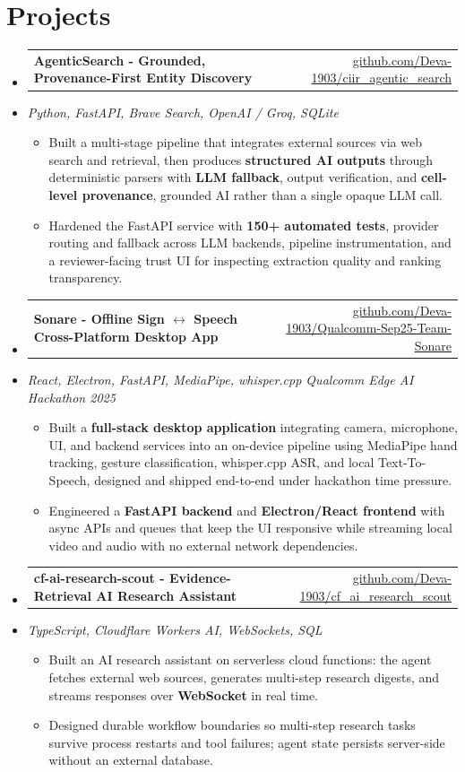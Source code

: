 \documentclass[letterpaper,10pt]{article}
\makeatletter
\newcommand{\resumeItem}[1]{
  \item\small{#1\vspace{-1pt}}
}
\newcommand{\resumeProjectHeading}[2]{
    \item
    \begin{tabular*}{0.985\textwidth}[t]{l@{\extracolsep{\fill}}r}
      \small\textbf{#1} & \small #2 \\
    \end{tabular*}\vspace{-5pt}
}
\newcommand{\resumeProjectSubheading}[1]{
  \vspace{-2pt}\item[] {\small\textcolor{ResumeSlate}{\emph{#1}}}\vspace{-3pt}
}
\newcommand{\resumeSubHeadingListStart}{\begin{itemize}[leftmargin=0.0in, label={}, itemsep=2pt, topsep=2pt]}
\newcommand{\resumeSubHeadingListEnd}{\end{itemize}}
\newcommand{\resumeItemListStart}{\begin{itemize}[leftmargin=0.18in, itemsep=2pt, topsep=1pt]}
\newcommand{\resumeItemListEnd}{\end{itemize}\vspace{-4pt}}
\makeatother
\begin{document}
\section{Projects}
\resumeSubHeadingListStart
  \resumeProjectHeading
    {AgenticSearch - Grounded, Provenance-First Entity Discovery}
    {\href{https://github.com/Deva-1903/ciir_agentic_search}{github.com/Deva-1903/ciir\_agentic\_search}}
  \resumeProjectSubheading{Python, FastAPI, Brave Search, OpenAI / Groq, SQLite}
    \resumeItemListStart
      \resumeItem{Built a multi-stage pipeline that integrates external sources via web search and retrieval, then produces \textbf{structured AI outputs} through deterministic parsers with \textbf{LLM fallback}, output verification, and \textbf{cell-level provenance}, grounded AI rather than a single opaque LLM call.}
      \resumeItem{Hardened the FastAPI service with \textbf{150+ automated tests}, provider routing and fallback across LLM backends, pipeline instrumentation, and a reviewer-facing trust UI for inspecting extraction quality and ranking transparency.}
    \resumeItemListEnd
  \resumeProjectHeading
    {Sonare - Offline Sign \(\leftrightarrow\) Speech Cross-Platform Desktop App}
    {\href{https://github.com/Deva-1903/Qualcomm-Sep25-Team-Sonare}{github.com/Deva-1903/Qualcomm-Sep25-Team-Sonare}}
  \resumeProjectSubheading{React, Electron, FastAPI, MediaPipe, whisper.cpp \enspace\textbar\enspace Qualcomm Edge AI Hackathon 2025}
    \resumeItemListStart
      \resumeItem{Built a \textbf{full-stack desktop application} integrating camera, microphone, UI, and backend services into an on-device pipeline using MediaPipe hand tracking, gesture classification, whisper.cpp ASR, and local Text-To-Speech, designed and shipped end-to-end under hackathon time pressure.}
      \resumeItem{Engineered a \textbf{FastAPI backend} and \textbf{Electron/React frontend} with async APIs and queues that keep the UI responsive while streaming local video and audio with no external network dependencies.}
    \resumeItemListEnd
  \resumeProjectHeading
    {cf-ai-research-scout - Evidence-Retrieval AI Research Assistant}
    {\href{https://github.com/Deva-1903/cf_ai_research_scout}{github.com/Deva-1903/cf\_ai\_research\_scout}}
  \resumeProjectSubheading{TypeScript, Cloudflare Workers AI, WebSockets, SQL}
    \resumeItemListStart
      \resumeItem{Built an AI research assistant on serverless cloud functions: the agent fetches external web sources, generates multi-step research digests, and streams responses over \textbf{WebSocket} in real time.}
      \resumeItem{Designed durable workflow boundaries so multi-step research tasks survive process restarts and tool failures; agent state persists server-side without an external database.}
    \resumeItemListEnd
\resumeSubHeadingListEnd
\vspace{-4pt}
\end{document}

